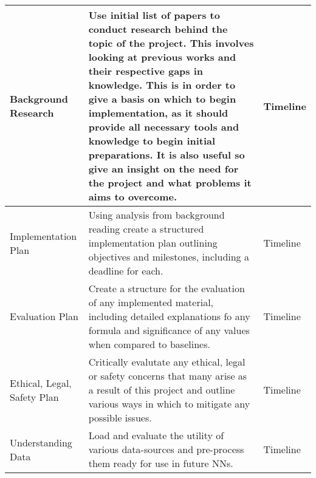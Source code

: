 \begin{longtable}{|| P{0.2\textwidth} | P{.45\textwidth} | P{.15\textwidth} ||}
    \hline
    Background Research                                  & Use initial list of papers to conduct research behind the topic of the project. This involves looking at previous works and their respective gaps in knowledge. This is in order to give a basis on which to begin implementation, as it should provide all necessary tools and knowledge to begin initial preparations. It is also useful so give an  insight on the need for the project and what problems it aims to overcome. & Timeline                                  \\
    \hline
    Implementation Plan                                  & Using analysis from background reading create a structured implementation plan outlining objectives and milestones, including a deadline for each.                                                                                                                                                                                                                                                                                & Timeline                                  \\
    \hline
    Evaluation Plan                                      & Create a structure for the evaluation of any implemented material, including detailed explanations fo any formula and significance of any values when compared to baselines.                                                                                                                                                                                                                                                      & Timeline                                  \\
    \hline
    Ethical, Legal, Safety Plan                          & Critically evalutate any ethical, legal or safety concerns that many arise as a result of this project and outline various ways in which to mitigate any possible issues.                                                                                                                                                                                                                                                         & Timeline                                  \\
    \hline
    Understanding Data                                   & Load and evaluate the utility of various data-sources and pre-process them ready for use in future NNs.                                                                                                                                                                                                                                                                                                                           & Timeline                                  \\

\end{longtable}
